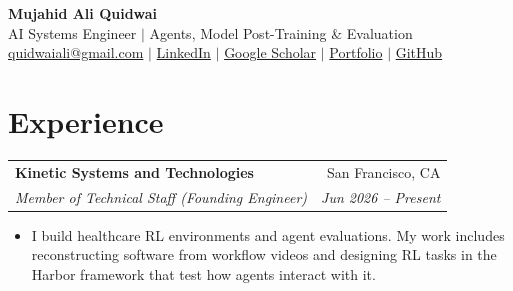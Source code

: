 \documentclass[letterpaper,11pt]{article}
\makeatletter
\newcommand{\entry}[4]{%
  \begin{tabularx}{\textwidth}{@{}X r@{}}
    \textbf{#1} & #2 \\
    \textit{#3} & \textit{#4} \\
  \end{tabularx}\vspace{-3pt}}
\newenvironment{bullets}{\begin{itemize}[leftmargin=12pt,itemsep=2pt,parsep=0pt,topsep=1.5pt]}{\end{itemize}\vspace{3pt}}
\makeatother
\begin{document}
\fontsize{11.2}{13.6}\selectfont
\begin{center}
  {\LARGE \textbf{Mujahid Ali Quidwai}}\\[3pt]
  \small AI Systems Engineer $\mid$ Agents, Model Post-Training \& Evaluation\\[3pt]
  \href{mailto:quidwaiali@gmail.com}{quidwaiali@gmail.com} $\mid$
  \href{https://www.linkedin.com/in/mujahid-ali-q/}{LinkedIn} $\mid$
  \href{https://scholar.google.com/citations?user=rAAtZi0AAAAJ}{Google Scholar} $\mid$
  \href{https://ali-maq.github.io/}{Portfolio} $\mid$
  \href{https://github.com/Ali-Maq}{GitHub}
\end{center}
\vspace{-7pt}

\section{Experience}
\entry{Kinetic Systems and Technologies}{San Francisco, CA}{Member of Technical Staff (Founding Engineer)}{Jun 2026 -- Present}
\begin{bullets}
  \item I build healthcare RL environments and agent evaluations. My work includes reconstructing software from workflow videos
        and designing RL tasks in the Harbor framework that test how agents interact with it.
\end{bullets}
\end{document}
